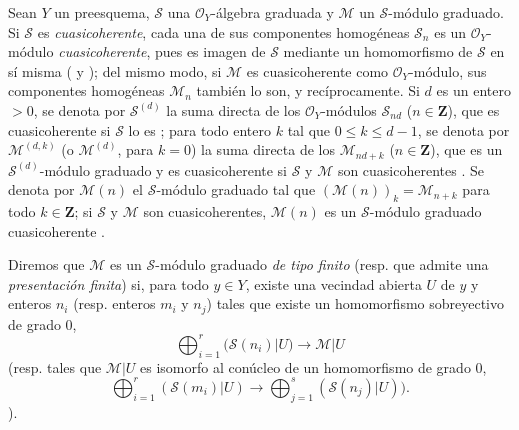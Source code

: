 \documentclass[oneside,10pt]{amsart}
\renewcommand{\leq}{\leqslant}
\let\EGAOriginalLabel\label
\renewcommand{\label}[1]{\phantomsection\EGAOriginalLabel{#1}}
\begin{document}
\begin{env}[3.1.1]
\label{II.3.1.1-fr}
Sean $Y$ un preesquema, $\mathcal{S}$ una $\mathcal{O}_Y$-álgebra graduada y $\mathcal{M}$ un $\mathcal{S}$-módulo graduado.
Si $\mathcal{S}$ es \emph{cuasicoherente}, cada una de sus componentes homogéneas $\mathcal{S}_n$ es un $\mathcal{O}_Y$-módulo \emph{cuasicoherente}, pues es imagen de $\mathcal{S}$ mediante un homomorfismo de $\mathcal{S}$ en sí misma ( y ); del mismo modo, si $\mathcal{M}$ es cuasicoherente como $\mathcal{O}_Y$-módulo, sus componentes homogéneas $\mathcal{M}_n$ también lo son, y recíprocamente.
Si $d$ es un entero $>0$, se denota por $\mathcal{S}^{(d)}$ la suma directa de los $\mathcal{O}_Y$-módulos $\mathcal{S}_{nd}$ ($n\in\mathbf{Z}$), que es cuasicoherente si $\mathcal{S}$ lo es ; para todo entero $k$ tal que $0\leq k\leq d-1$, se denota por $\mathcal{M}^{(d,k)}$ (o $\mathcal{M}^{(d)}$, para $k=0$) la suma directa de los $\mathcal{M}_{nd+k}$ ($n\in\mathbf{Z}$), que es un $\mathcal{S}^{(d)}$-módulo graduado y es cuasicoherente si $\mathcal{S}$ y $\mathcal{M}$ son cuasicoherentes .
Se denota por $\mathcal{M}(n)$ el $\mathcal{S}$-módulo graduado tal que $(\mathcal{M}(n))_k=\mathcal{M}_{n+k}$ para todo $k\in\mathbf{Z}$; si $\mathcal{S}$ y $\mathcal{M}$ son cuasicoherentes, $\mathcal{M}(n)$ es un $\mathcal{S}$-módulo graduado cuasicoherente .

Diremos que $\mathcal{M}$ es un $\mathcal{S}$-módulo graduado \emph{de tipo finito} (resp. que admite una \emph{presentación finita}) si, para todo $y\in Y$, existe una vecindad abierta $U$ de $y$ y enteros $n_i$ (resp. enteros $m_i$ y $n_j$) tales que existe un homomorfismo sobreyectivo de grado $0$, \[
  \bigoplus_{i=1}^r(\mathcal{S}(n_i)|U)\longrightarrow\mathcal{M}|U
\] (resp. tales que $\mathcal{M}|U$ es isomorfo al conúcleo de un homomorfismo de grado $0$, \[
  \bigoplus_{i=1}^r(\mathcal{S}(m_i)|U)
  \longrightarrow\bigoplus_{j=1}^s(\mathcal{S}(n_j)|U)).
\]).


\end{env}
\end{document}

